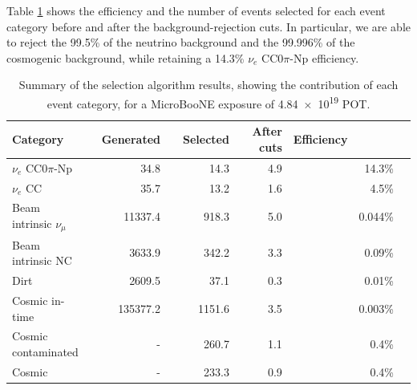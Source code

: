 Table \ref{tab:effafter} shows the efficiency and the number of events selected for each event category before and after the background-rejection cuts. In particular, we are able to reject the 99.5\% of the neutrino background and the 
99.996\% of the cosmogenic background, while retaining a 14.3\% $\nu_{e}$ CC0$\pi$-Np efficiency.

\begin{table}[htbp]
   \centering
   \begin{tabular}{llrrrrrrrr}
     \toprule
     Category & \phantom{a} & Generated & \phantom{a} & Selected & \phantom{a} & After cuts & \phantom{a} Efficiency\\
     \midrule

     $\nu_{e}$ CC0$\pi$-Np       & & 34.8     & & 14.3   & & 4.9   & & 14.3\%\\
     $\nu_{e}$ CC                & & 35.7     & & 13.2   & & 1.6   & & 4.5\%\\
     Beam intrinsic $\nu_{\mu}$  & & 11337.4  & & 918.3  & & 5.0   & & 0.044\%\\
     Beam intrinsic NC           & & 3633.9   & & 342.2  & & 3.3   & & 0.09\%\\
     Dirt                        & & 2609.5   & & 37.1   & & 0.3   & & 0.01\%\\
     Cosmic in-time              & & 135377.2 & & 1151.6 & & 3.5   & & 0.003\%\\
     Cosmic contaminated         & & -        & & 260.7  & & 1.1   & & 0.4\%\\
     Cosmic                      & & -        & & 233.3  & & 0.9   & & 0.4\%\\

     \bottomrule
   \end{tabular}
   \caption{Summary of the selection algorithm results, showing the contribution of each event category, for a MicroBooNE exposure of \num{4.84e19} POT.}\label{tab:effafter}
\end{table}

